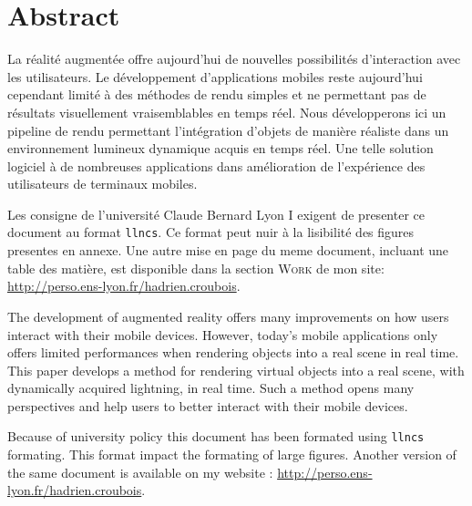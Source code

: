 \documentclass[10pt,a4paper,twoside, twocolumn]{report}
\begin{document}
\vfill

{}
\section*{Abstract}

\begin{center}

  \vfill
  
	La réalité augmentée offre aujourd'hui de nouvelles possibilités d’interaction avec les utilisateurs. Le développement d'applications mobiles reste aujourd'hui cependant limité à des méthodes de rendu simples et ne permettant pas de résultats visuellement vraisemblables en temps réel. Nous développerons ici un pipeline de rendu permettant l’intégration d'objets de manière réaliste dans un environnement lumineux dynamique acquis en temps réel. Une telle solution logiciel à de nombreuses applications dans amélioration de l’expérience des utilisateurs de terminaux mobiles.

	\ifllncs
	Les consigne de l'université Claude Bernard Lyon I exigent de presenter ce document au format \texttt{llncs}. Ce format peut nuir à la lisibilité des figures presentes en annexe. Une autre mise en page du meme document, incluant une table des matière, est disponible dans la section \textsc{Work} de mon site: \href{http://perso.ens-lyon.fr/hadrien.croubois}{http://perso.ens-lyon.fr/hadrien.croubois}.
	\fi

	\bigskip

	The development of augmented reality offers many improvements on how users interact with their mobile devices. However, today's mobile applications only offers limited performances when rendering objects into a real scene in real time. This paper develops a method for rendering virtual objects into a real scene, with dynamically acquired lightning, in real time. Such a method opens many perspectives and help users to better interact with their mobile devices.
	
	\ifllncs
	Because of university policy this document has been formated using \texttt{llncs} formating. This format impact the formating of large figures. Another version of the same document is available on my website : \href{http://perso.ens-lyon.fr/hadrien.croubois}{http://perso.ens-lyon.fr/hadrien.croubois}.
	\fi

  \vfill

\end{center}
\end{document}
